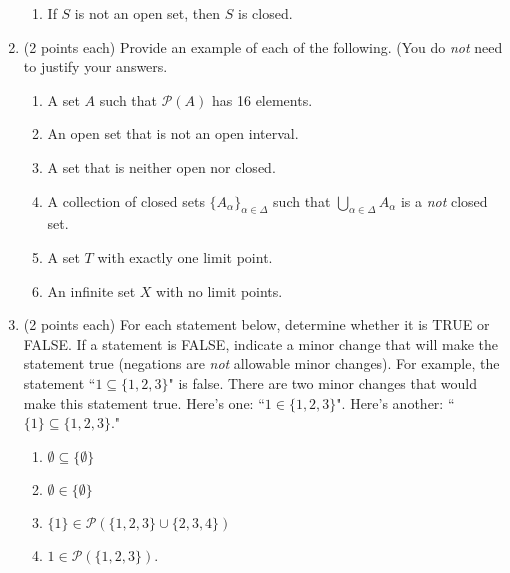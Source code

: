 \documentclass[11pt]{article}
\theoremstyle{definition}
\begin{document}
\begin{enumerate}
\begin{enumerate}
\item If $S$ is not an open set, then $S$ is closed.

\end{enumerate} 

\item (2 points each) Provide an example of each of the following.  (You do \emph{not} need to justify your answers.

\begin{enumerate}

\item A set $A$ such that $\mathcal{P}(A)$ has 16 elements.

\item An open set that is not an open interval.

\item A set that is neither open nor closed.

\item A collection of closed sets $\{A_{\alpha}\}_{\alpha\in\Delta}$ such that $\displaystyle \bigcup_{\alpha\in \Delta} A_{\alpha}$ is a \emph{not} closed set.

\item A set $T$ with exactly one limit point.

\item An infinite set $X$ with no limit points.

\end{enumerate}

\item (2 points each) For each statement below, determine whether it is TRUE or FALSE.  If a statement is FALSE, indicate a minor change that will make the statement true (negations are \emph{not} allowable minor changes).  For example, the statement ``$1 \subseteq \{1,2,3\}$" is false. There are two minor changes that would make this statement true.  Here's one: ``$1\in \{1,2,3\}$".  Here's another: ``$\{1\}\subseteq \{1,2,3\}$."

\begin{enumerate}

\item $\emptyset \subseteq \{\emptyset\}$

\item $\emptyset \in \{\emptyset\}$

\item $\{1\} \in \mathcal{P}(\{1, 2, 3\} \cup \{2, 3, 4\})$

\item $1 \in \mathcal{P}(\{1,2,3\})$.


\end{enumerate}
\end{enumerate}
\end{document}
